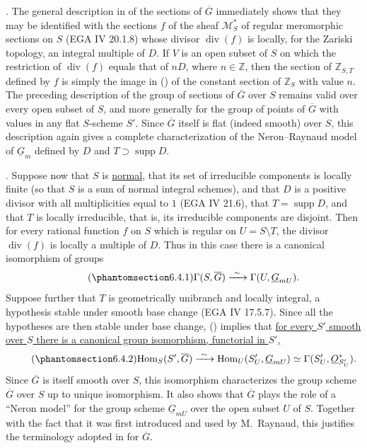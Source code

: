 \medskip
\noindent {}.  The general description in  of the sections of
$\overline G$ immediately shows that they may be identified with the
sections $f$ of the sheaf $\mathcal M_S^*$ of regular meromorphic sections
on $S$ (EGA IV 20.1.8) whose divisor $\operatorname{div}(f)$ is locally, for
the Zariski topology, an integral multiple of $D$.  If $V$ is an open subset
of $S$ on which the restriction of $\operatorname{div}(f)$ equals that of
$nD$, where $n\in\mathbb Z$, then the section of $\mathbb Z_{S,T}$ defined
by $f$ is simply the image in () of the constant section of
$\mathbb Z_S$ with value $n$.  The preceding description of the group of
sections of $\overline G$ over $S$ remains valid over every open subset of
$S$, and more generally for the group of points of $\overline G$ with
values in any flat $S$-scheme $S'$.  Since $\overline G$ itself is flat
(indeed smooth) over $S$, this description again gives a complete
characterization of the Neron--Raynaud model of $\underline G_m$ defined by
$D$ and $T\supset\operatorname{supp}D$.

\medskip
\noindent {}.  Suppose now that $S$ is \underline{normal}, that its set of
irreducible components is locally finite (so that $S$ is a sum of normal
integral schemes), and that $D$ is a positive divisor with all
multiplicities equal to $1$ (EGA IV 21.6), that $T=\operatorname{supp}D$,
and that $T$ is locally irreducible, that is, its irreducible components are
disjoint.  Then for every rational function $f$ on $S$ which is regular on
$U=S\setminus T$, the divisor $\operatorname{div}(f)$ is locally a multiple
of $D$.  Thus in this case there is a canonical isomorphism of groups
\begin{equation}\tag{\SGARefTarget{sga7.sga7i.eviii.n6-4-1}{6.4.1}}
 \Gamma(S,\overline G)\xrightarrow{\ \sim\ }
 \Gamma(U,\underline G_{mU}).
\end{equation}
Suppose further that $T$ is geometrically unibranch and locally integral, a
hypothesis stable under smooth base change (EGA IV 17.5.7).  Since all the
hypotheses are then stable under base change, () implies that
\underline{for every $S'$ smooth over $S$ there is a canonical group
isomorphism, functorial in $S'$,}
\begin{equation}\tag{\SGARefTarget{sga7.sga7i.eviii.n6-4-2}{6.4.2}}
 \mathrm{Hom}_S(S',\overline G)\xrightarrow{\ \sim\ }
 \mathrm{Hom}_U(S'_U,\underline G_{mU})
 \simeq\Gamma(S'_U,\underline O_{S'_U}^*).
\end{equation}
Since $\overline G$ is itself smooth over $S$, this isomorphism characterizes
the group scheme $\overline G$ over $S$ up to unique isomorphism.  It also
shows that $\overline G$ plays the role of a ``Neron model'' for the group
scheme $\underline G_{mU}$ over the open subset $U$ of $S$.  Together with
the fact that it was first introduced and used by M.~Raynaud, this justifies
the terminology adopted in  for $\overline G$.

